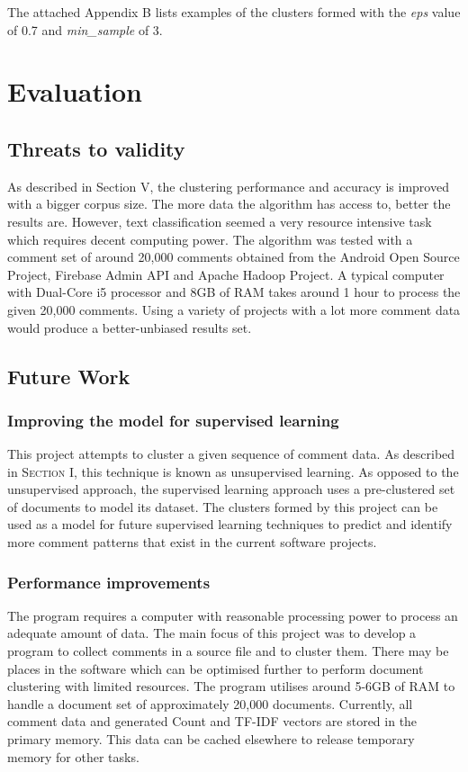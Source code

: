 \documentclass[conference]{IEEEtran}
\begin{document}
The attached Appendix B lists examples of the clusters formed with the \textit{eps} value of 0.7 and \textit{min\_sample} of 3.

\section{Evaluation}

\subsection{Threats to validity}

As described in Section V, the clustering performance and accuracy is improved with a bigger corpus size. The more data the algorithm has access to, better the results are. However, text classification seemed a very resource intensive task which requires decent computing power. The algorithm was tested with a comment set of around 20,000 comments obtained from the Android Open Source Project, Firebase Admin API and Apache Hadoop Project. A typical computer with Dual-Core i5 processor and 8GB of RAM takes around 1 hour to process the given 20,000 comments. Using a variety of projects with a lot more comment data would produce a better-unbiased results set.

\subsection{Future Work}

\subsubsection{Improving the model for supervised learning} 

This project attempts to cluster a given sequence of comment data. As described in \textsc{Section I}, this technique is known as unsupervised learning. As opposed to the unsupervised approach, the supervised learning approach uses a pre-clustered set of documents to model its dataset. The clusters formed by this project can be used as a model for future supervised learning techniques to predict and identify more comment patterns that exist in the current software projects. 

\subsubsection{Performance improvements} 

The program requires a computer with reasonable processing power to process an adequate amount of data. The main focus of this project was to develop a program to collect comments in a source file and to cluster them. There may be places in the software which can be optimised further to perform document clustering with limited resources.  The program utilises around 5-6GB of RAM to handle a document set of approximately 20,000 documents. Currently, all comment data and generated Count and TF-IDF vectors are stored in the primary memory. This data can be cached elsewhere to release temporary memory for other tasks. 
\end{document}
